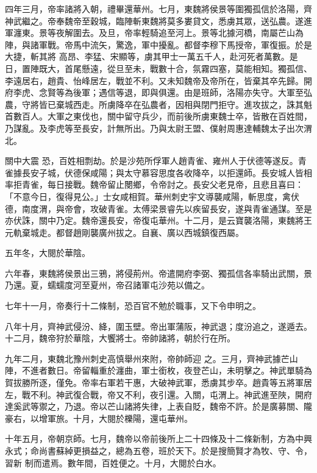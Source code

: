 \begin{pinyinscope}
 四年三月，帝率諸將入朝，禮畢還華州。七月，東魏將侯景等圍獨孤信於洛陽，齊神武繼之。帝奉魏帝至穀城，臨陣斬東魏將莫多婁貸文，悉虜其眾，送弘農。遂進軍瀍東。景等夜解圍去。及旦，帝率輕騎追至河上。景等北據河橋，南屬芒山為陣，與諸軍戰。帝馬中流矢，驚逸，軍中擾亂。都督李穆下馬授帝，軍復振。於是大捷，斬其將
 高昂、李猛、宋顯等，虜其甲士一萬五千人，赴河死者萬數。是日，置陣既大，首尾懸遠，從旦至未，戰數十合，氛霧四塞，莫能相知。獨孤信、李遠居右，趙貴、怡峰居左，戰並不利。又未知魏帝及帝所在，皆棄其卒先歸。開府李虎、念賢等為後軍；遇信等退，即與俱還。由是班師，洛陽亦失守。大軍至弘農，守將皆已棄城西走。所虜降卒在弘農者，因相與閉門拒守。進攻拔之，誅其魁首數百人。大軍之東伐也，關中留守兵少，而前後所虜東魏士卒，皆散在百姓間，乃謀亂。及李虎等至長安，計無所出。乃與太尉王盟、僕射周惠達輔魏太子出次渭北。



 關中大震
 恐，百姓相剽劫。於是沙苑所俘軍人趙青雀、雍州人于伏德等遂反。青雀據長安子城，伏德保咸陽；與太守慕容思度各收降卒，以拒還師。長安城人皆相率拒青雀，每日接戰。魏帝留止閿鄉，令帝討之。長安父老見帝，且悲且喜曰：「不意今日，復得見公。」士女咸相賀。華州刺史宇文導襲咸陽，斬思度，禽伏德，南度渭，與帝會，攻破青雀。太傅梁景睿先以疾留長安，遂與青雀通謀。至是亦伏誅，關中乃定。魏帝還長安，帝復屯華州。十二月，是云寶襲洛陽，東魏將王元軌棄城走。都督趙剛襲廣州拔之。自襄、廣以西城鎮復西屬。



 五年冬，大閱於華陰。



 六年春，東魏將侯景出三鴉，將侵荊州。帝遣開府李弼、獨孤信各率騎出武關，景乃還。夏，蠕蠕度河至夏州，帝召諸軍屯沙苑以備之。



 七年十一月，帝奏行十二條制，恐百官不勉於職事，又下令申明之。



 八年十月，齊神武侵汾、絳，圍玉壁。帝出軍蒲阪，神武退；度汾追之，遂遁去。十二月，魏帝狩於華陰，大饗將士。帝帥諸將，朝於行在所。



 九年二月，東魏北豫州刺史高慎舉州來附，帝帥師迎
 之。三月，齊神武據芒山陣，不進者數日。帝留輜重於瀍曲，軍士銜枚，夜登芒山，未明擊之。神武單騎為賀拔勝所逐，僅免。帝率右軍若干惠，大破神武軍，悉虜其步卒。趙貴等五將軍居左，戰不利。神武復合戰，帝又不利，夜引還。入關，屯渭上。神武進至陜，開府達奚武等禦之，乃退。帝以芒山諸將失律，上表自貶，魏帝不許。於是廣募關、隴豪右，以增軍旅。十月，大閱於櫟陽，還屯華州。



 十年五月，帝朝京師。七月，魏帝以帝前後所上二十四條及十二條新制，方為中興永式；命尚書蘇綽更損益之，總為五卷，班於天下。於是搜簡賢才為牧、守、令，習新
 制而遣焉。數年間，百姓便之。十月，大閱於白水。




\end{pinyinscope}
